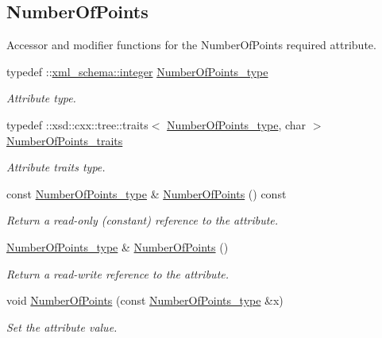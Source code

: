 \subsection*{Number\+Of\+Points}
\label{_amgrp38600d7fb1ccb3e7ee12b901540b4f7d}%
Accessor and modifier functions for the Number\+Of\+Points required attribute. \begin{DoxyCompactItemize}
\item 
typedef \+::\hyperlink{namespacexml__schema_aaaea7c8ce4dfbe26cc52c91c29c97b7c}{xml\+\_\+schema\+::integer} \hyperlink{classPieceUnstructuredGrid__t_a8df1cd0d138d990e166d325ceed9a660}{Number\+Of\+Points\+\_\+type}
\begin{DoxyCompactList}\small\item\em Attribute type. \end{DoxyCompactList}\item 
typedef \+::xsd\+::cxx\+::tree\+::traits$<$ \hyperlink{classPieceUnstructuredGrid__t_a8df1cd0d138d990e166d325ceed9a660}{Number\+Of\+Points\+\_\+type}, char $>$ \hyperlink{classPieceUnstructuredGrid__t_acdfbb1dc264a5a48bcc6d4aa815db003}{Number\+Of\+Points\+\_\+traits}
\begin{DoxyCompactList}\small\item\em Attribute traits type. \end{DoxyCompactList}\item 
const \hyperlink{classPieceUnstructuredGrid__t_a8df1cd0d138d990e166d325ceed9a660}{Number\+Of\+Points\+\_\+type} \& \hyperlink{classPieceUnstructuredGrid__t_a6fe4a92f59d9a837e046bf3d51e79b33}{Number\+Of\+Points} () const 
\begin{DoxyCompactList}\small\item\em Return a read-\/only (constant) reference to the attribute. \end{DoxyCompactList}\item 
\hyperlink{classPieceUnstructuredGrid__t_a8df1cd0d138d990e166d325ceed9a660}{Number\+Of\+Points\+\_\+type} \& \hyperlink{classPieceUnstructuredGrid__t_adadae535c3c291dc01dd0be3315d9dbc}{Number\+Of\+Points} ()
\begin{DoxyCompactList}\small\item\em Return a read-\/write reference to the attribute. \end{DoxyCompactList}\item 
void \hyperlink{classPieceUnstructuredGrid__t_a3e4e5defa42f9ecebb2016ca1d207700}{Number\+Of\+Points} (const \hyperlink{classPieceUnstructuredGrid__t_a8df1cd0d138d990e166d325ceed9a660}{Number\+Of\+Points\+\_\+type} \&x)
\begin{DoxyCompactList}\small\item\em Set the attribute value. \end{DoxyCompactList}\end{DoxyCompactItemize}
